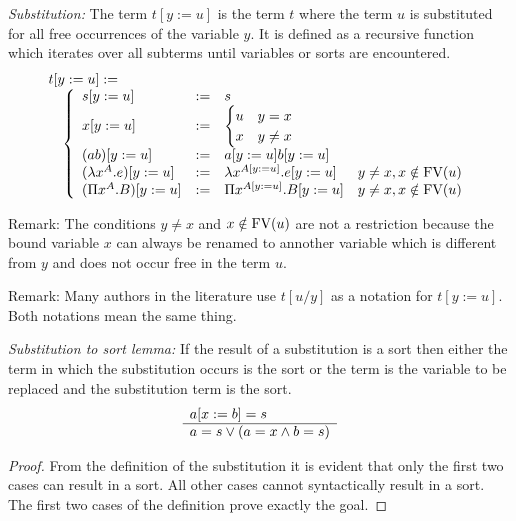 \begin{definition}
    \emph{Substitution:}
    The term $t[y:=u]$ is the term $t$ where the term $u$ is substituted for all
    free occurrences of the variable $y$. It is defined as a recursive function
    which iterates over all subterms until variables or sorts are encountered.
    $$
    \begin{array}{l}
        t[y:=u] :=
        \\
        \quad\left\{ \begin{array}{llll} 
            s[y:=u] &:=& s
            \\
            x[y:=u] &:=&
                \begin{cases}
                    u & y = x
                    \\
                    x & y \ne x
                \end{cases}
            \\
            (a b)[y:=u] &:=& a[y:=u] b[y:=u]
            \\
            (\lambda x^A . e)[y:=u]
            &:=&
            \lambda x^{A[y:=u]}.e[y:=u]
            & y \ne x, x \notin \text{FV}(u)
            \\
            (\Pi x^A . B)[y:=u]
            &:=&
            \Pi x^{A[y:=u]}. B[y:=u]
            & y \ne x, x \notin \text{FV}(u)
         \end{array} \right.
    \end{array}
    $$
\end{definition}

Remark:
        The conditions $y \ne x$ and $x \notin \text{FV}(u)$ are not a restriction
        because the bound variable $x$ can always be renamed to annother
        variable which is different from $y$ and does not occur free in the term
        $u$.

Remark:
        Many authors in the literature use $t[u/y]$ as a notation for $t[y:=u]$.
        Both notations mean the same thing.


\begin{lemma}
    \label{SubstitutionToSort}
    \emph{Substitution to sort lemma:}
    If the result of a substitution is a sort then either the term in
    which the substitution occurs is the sort or the term is the variable to be
    replaced and the substitution term is the sort.
    $$
        \begin{array}{l} 
            a[x:=b] = s
         \\ \hline 
            a = s \lor (a = x \land b = s)
        \end{array}
    $$
    \begin{proof}
        From the definition of the substitution it is evident that only the
        first two cases can result in a sort. All other cases cannot
        syntactically result in a sort. The first two cases of the definition
        prove exactly the goal.
    \end{proof}
\end{lemma}



